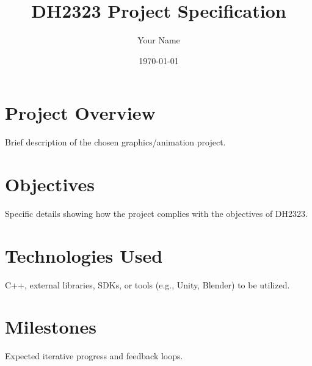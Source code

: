\documentclass{article}
\title{DH2323 Project Specification}
\author{Your Name}
\date{\today}
\begin{document}
\maketitle

\section{Project Overview}
Brief description of the chosen graphics/animation project.

\section{Objectives}
Specific details showing how the project complies with the objectives of DH2323.

\section{Technologies Used}
C++, external libraries, SDKs, or tools (e.g., Unity, Blender) to be utilized.

\section{Milestones}
Expected iterative progress and feedback loops.
\end{document}
